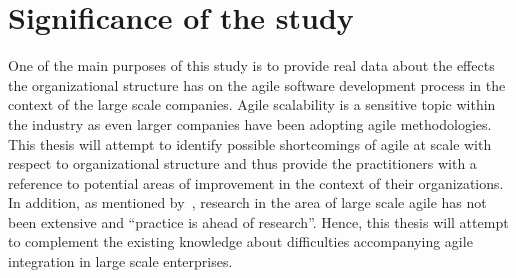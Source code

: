 \documentclass[paper=a4, fontsize=11pt]{scrartcl}
\numberwithin{equation}{section}		%
\numberwithin{figure}{section}			%
\numberwithin{table}{section}			%
\newcommand{\quotes}[1]{``#1''}
\begin{document}
\section{Significance of the study}

One of the main purposes of this study is to provide real data about the effects the organizational structure has on the agile software development process in the context of the large scale companies. 
Agile scalability is a sensitive topic within the industry as even larger companies have been adopting agile methodologies. This thesis will attempt to identify possible shortcomings of agile at scale with respect to organizational structure and thus provide the practitioners with a reference to potential areas of improvement in the context of their organizations. In addition, as mentioned by~\citet{ding2013research}, research in the area of large scale agile has not been extensive and \quotes{practice is ahead of research}. Hence, this thesis will attempt to complement the existing knowledge about difficulties accompanying agile integration in large scale enterprises.

\pagebreak



\end{document}
